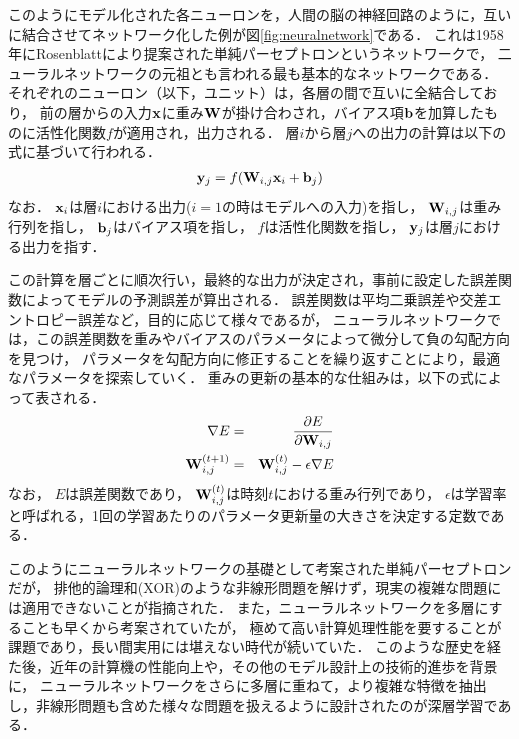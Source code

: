 このようにモデル化された各ニューロンを，人間の脳の神経回路のように，互いに結合させてネットワーク化した例が図\ref{fig:neuralnetwork}である．
これは1958年にRosenblattにより提案された単純パーセプトロンというネットワークで，
二ューラルネットワークの元祖とも言われる最も基本的なネットワークである\cite{rosenblatt1958perceptron}．
それぞれのニューロン（以下，ユニット）は，各層の間で互いに全結合しており，
前の層からの入力${\bf x}$に重み${\bf W}$が掛け合わされ，バイアス項${\bf b}$を加算したものに活性化関数$f$が適用され，出力される．
層$i$から層$j$への出力の計算は以下の式に基づいて行われる．
\begin{eqnarray}
{\bf y}_j =  f({\bf W}_{i,j} {\bf x}_i + {\bf b}_j)
\end{eqnarray}
なお．
${\bf x}_i$は層$i$における出力($i=1$の時はモデルへの入力)を指し，
${\bf W}_{i,j}$は重み行列を指し，
${\bf b}_j$はバイアス項を指し，
$f$は活性化関数を指し，
${\bf y}_j$は層$j$における出力を指す．

この計算を層ごとに順次行い，最終的な出力が決定され，事前に設定した誤差関数によってモデルの予測誤差が算出される．
誤差関数は平均二乗誤差や交差エントロピー誤差など，目的に応じて様々であるが，
ニューラルネットワークでは，この誤差関数を重みやバイアスのパラメータによって微分して負の勾配方向を見つけ，
パラメータを勾配方向に修正することを繰り返すことにより，最適なパラメータを探索していく．
重みの更新の基本的な仕組みは，以下の式によって表される．
\begin{eqnarray}
\nabla E &=& \frac{\partial E}{\partial {\bf W}_{i,j}}
\\
{\bf W}^{(t+1)}_{i,j} &=& {\bf W}^{(t)}_{i,j} - \epsilon \nabla E
\end{eqnarray}
なお，
$E$は誤差関数であり，
${\bf W}^{(t)}_{i,j}$は時刻$t$における重み行列であり，
$\epsilon$は学習率と呼ばれる，1回の学習あたりのパラメータ更新量の大きさを決定する定数である．

このようにニューラルネットワークの基礎として考案された単純パーセプトロンだが，
排他的論理和(XOR)のような非線形問題を解けず，現実の複雑な問題には適用できないことが指摘された\cite{minsky1969perceptron}．
また，ニューラルネットワークを多層にすることも早くから考案されていたが，
極めて高い計算処理性能を要することが課題であり，長い間実用には堪えない時代が続いていた．
このような歴史を経た後，近年の計算機の性能向上や，その他のモデル設計上の技術的進歩を背景に，
ニューラルネットワークをさらに多層に重ねて，より複雑な特徴を抽出し，非線形問題も含めた様々な問題を扱えるように設計されたのが深層学習である．


